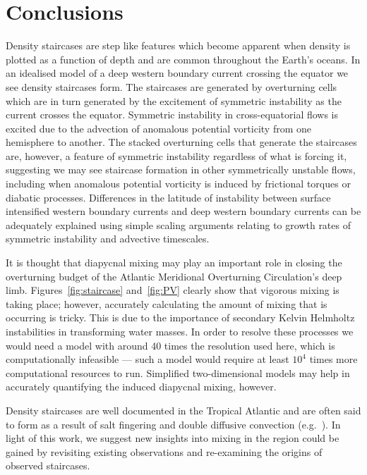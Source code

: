 \section{Conclusions}
\label{sec:conc}
Density staircases are step like features which become apparent when density is plotted as a function of depth and are common throughout the Earth's oceans. In an idealised model of a deep western boundary current crossing the equator we see density staircases form. The staircases are generated by overturning cells which are in turn generated by the excitement of symmetric instability as the current crosses the equator. Symmetric instability in cross-equatorial flows is excited due to the advection of anomalous potential vorticity from one hemisphere to another. The stacked overturning cells that generate the staircases are, however, a feature of symmetric instability regardless of what is forcing it, suggesting we may see staircase formation in other symmetrically unstable flows, including when anomalous potential vorticity is induced by frictional torques or diabatic processes. Differences in the latitude of instability between surface intensified western boundary currents and deep western boundary currents can be adequately explained using simple scaling arguments relating to growth rates of symmetric instability and advective timescales.

It is thought that diapycnal mixing may play an important role in closing the overturning budget of the Atlantic Meridional Overturning Circulation's deep limb. Figures~\ref{fig:staircase} and~\ref{fig:PV} clearly show that vigorous mixing is taking place; however, accurately calculating the amount of mixing that is occurring is tricky. This is due to the importance of secondary Kelvin Helmholtz instabilities in transforming water masses. In order to resolve these processes we would need a model with around 40 times the resolution used here, which is computationally infeasible --- such a model would require at least $10^4$ times more computational resources to run. Simplified two-dimensional models may help in accurately quantifying the induced diapycnal mixing, however.

Density staircases are well documented in the Tropical Atlantic and are often said to form as a result of salt fingering and double diffusive convection (e.g.~\citet{Schmitt1987, Schmitt2005}). In light of this work, we suggest new insights into mixing in the region could be gained by revisiting existing observations and re-examining the origins of observed staircases.
